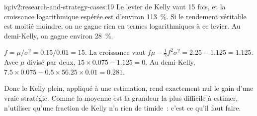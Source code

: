 \begin{solution}{iq:iv2:research-and-strategy-cases:19}
Le levier de Kelly vaut 15 fois, et la croissance logarithmique espérée est d'environ 113~\%. Si le rendement véritable est moitié moindre, on ne gagne rien en termes logarithmiques à ce levier. Au demi-Kelly, on gagne environ 28~\%.

$f = \mu/\sigma^2 = 0.15/0.01 = 15$. La croissance vaut $f\mu - \tfrac12 f^2\sigma^2 = 2.25 - 1.125 = 1.125$. Avec $\mu$ divisé par deux, $15 \times 0.075 - 1.125 = 0$. Au demi-Kelly, $7.5 \times 0.075 - 0.5 \times 56.25 \times 0.01 = 0.281$.

Donc le Kelly plein, appliqué à une estimation, rend exactement nul le gain d'une vraie stratégie. Comme la moyenne est la grandeur la plus difficile à estimer, n'utiliser qu'une fraction de Kelly n'a rien de timide~: c'est ce qu'il faut faire.

\end{solution}

